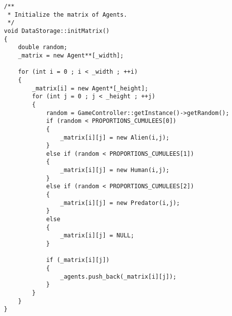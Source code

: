 \begin{lstlisting}[style=c++]
/**
 * Initialize the matrix of Agents.
 */
void DataStorage::initMatrix()
{
	double random;
	_matrix = new Agent**[_width];

	for (int i = 0 ; i < _width ; ++i)
	{
		_matrix[i] = new Agent*[_height];
		for (int j = 0 ; j < _height ; ++j)
		{
			random = GameController::getInstance()->getRandom();
			if (random < PROPORTIONS_CUMULEES[0])
            {
				_matrix[i][j] = new Alien(i,j);
            }
			else if (random < PROPORTIONS_CUMULEES[1])
            {
				_matrix[i][j] = new Human(i,j);
            }
			else if (random < PROPORTIONS_CUMULEES[2])
            {
				_matrix[i][j] = new Predator(i,j);
            }
			else
            {
				_matrix[i][j] = NULL;
            }
            
			if (_matrix[i][j])
            {
                _agents.push_back(_matrix[i][j]);
            }
		}
	}
}
\end{lstlisting}